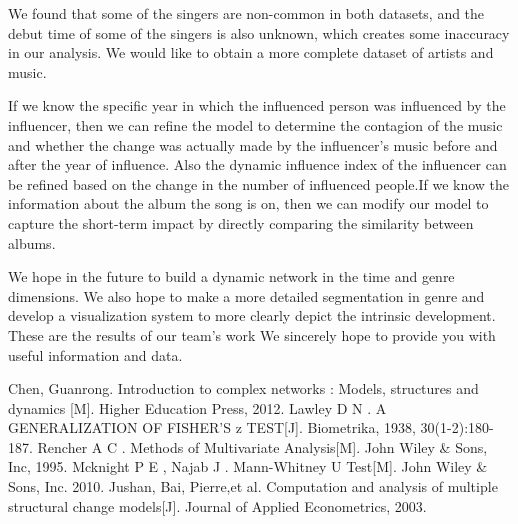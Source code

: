 \documentclass[12pt]{article}  %
\begin{document}
	We found that some of the singers are non-common in both datasets, and the debut time of some of the singers is also unknown, which creates some inaccuracy in our analysis. We would like to obtain a more complete dataset of artists and music.
	
	If we know the specific year in which the influenced person was influenced by the influencer, then we can refine the model to determine the contagion of the music and whether the change was actually made by the influencer's music before and after the year of influence. Also the dynamic influence index of the influencer can be refined based on the change in the number of influenced people.If we know the information about the album the song is on, then we can modify our model to capture the short-term impact by directly comparing the similarity between albums.
	
	We hope in the future to build a dynamic network in the time and genre dimensions. We also hope to make a more detailed segmentation in genre and develop a visualization system to more clearly depict the intrinsic development. These are the results of our team's work We sincerely hope to provide you with useful information and data.
	
	\clearpage
	
	\begin{thebibliography}{99}
		 Chen, Guanrong. Introduction to complex networks : Models, structures and dynamics [M]. Higher Education Press, 2012.
		 Lawley D N . A GENERALIZATION OF FISHER'S z TEST[J]. Biometrika, 1938, 30(1-2):180-187.
		 Rencher A C . Methods of Multivariate Analysis[M]. John Wiley \& Sons, Inc, 1995.
		 Mcknight P E , Najab J . Mann-Whitney U Test[M]. John Wiley \& Sons, Inc. 2010.
		 Jushan, Bai, Pierre,et al. Computation and analysis of multiple structural change models[J]. Journal of Applied Econometrics, 2003.
	\end{thebibliography}
	
	
	
	
	
	
\end{document}
